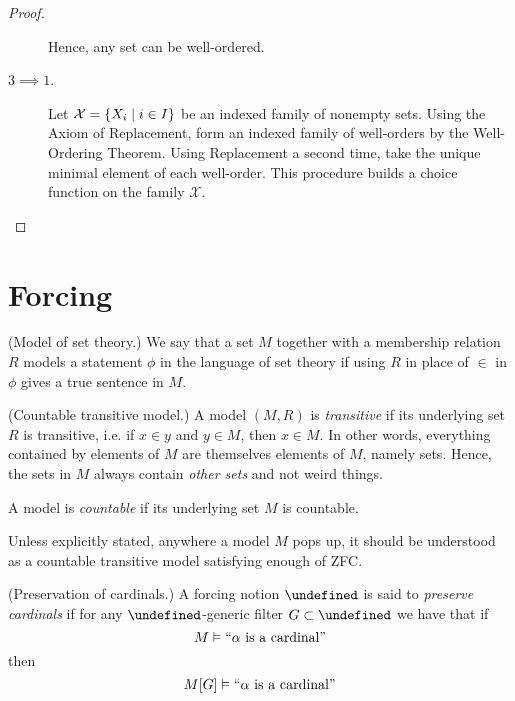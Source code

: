 \documentclass[11pt]{article}
\let\P\undefined
\begin{document}
\begin{proof}
\begin{description}
            Hence, any set can be well-ordered.

        \item[$3 \implies 1$.]
            Let $\mathcal{X} = \left\{X_i \;\vert\; i \in I\right\}$ be an indexed family
            of nonempty sets.
            Using the Axiom of Replacement, form an indexed family of
            well-orders by the Well-Ordering Theorem.
            Using Replacement a second time, take the unique minimal element of
            each well-order.
            This procedure builds a choice function on the family
            $\mathcal{X}$.
    \end{description}
\end{proof}

\section{Forcing}

\begin{defn}{(Model of set theory.)}
    We say that a set $M$ together with a membership relation $R$ models a
    statement $\phi$ in the language of set theory if using $R$ in place of
    $\in$ in $\phi$ gives a true sentence in $M$.
\end{defn}

\begin{defn}{(Countable transitive model.)}
    A model $(M, R)$ is \emph{transitive} if its underlying set $R$ is
    transitive, i.e. if $x \in y$ and $y \in M$, then $x \in M$.
    In other words, everything contained by elements of $M$ are themselves
    elements of $M$, namely sets.
    Hence, the sets in $M$ always contain \emph{other sets} and not weird
    things.

    A model is \emph{countable} if its underlying set $M$ is countable.
\end{defn}

Unless explicitly stated, anywhere a model $M$ pops up, it should be understood
as a countable transitive model satisfying enough of ZFC.

\begin{defn}{(Preservation of cardinals.)}
    A forcing notion $\P$ is said to \emph{preserve cardinals} if for any
    $\P$-generic filter $G \subset \P$ we have that if
    \begin{equation*}
        M \vDash \text{``$\alpha$ is a cardinal''}
    \end{equation*}
    then
    \begin{equation*}
        M[G] \vDash \text{``$\alpha$ is a cardinal''}
    \end{equation*}
\end{defn}
\end{document}

